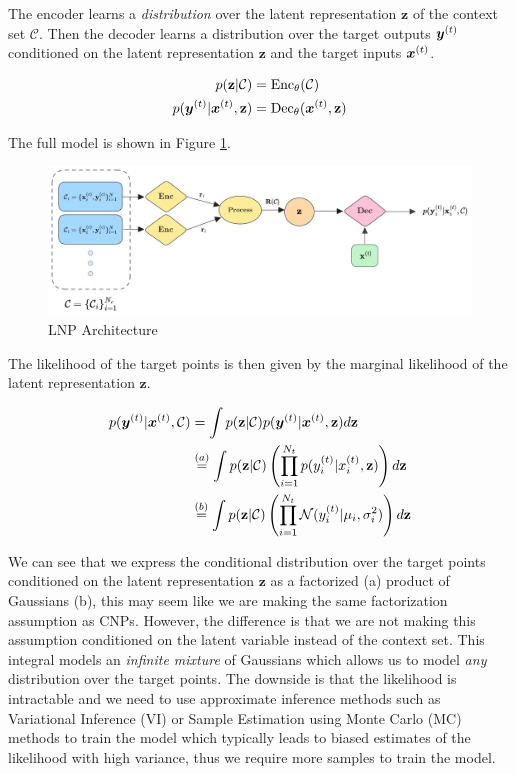 \documentclass[../../main.tex]{subfiles}
\begin{document}
The encoder learns a \emph{distribution} over the latent representation $\mathbf{z}$ of the context set $\mathcal{C}$. Then the decoder learns a distribution over the target outputs $\bm{y}^{(t)}$ conditioned on the latent representation $\mathbf{z}$ and the target inputs $\bm{x}^{(t)}$.

\begin{align*}
    p(\mathbf{z} | \mathcal{C}) &= \text{Enc}_\theta(\mathcal{C})\\ p(\bm{y}^{(t)} | \bm{x}^{(t)}, \mathbf{z}) &= \text{Dec}_\theta(\bm{x}^{(t)}, \mathbf{z})
\end{align*}

The full model is shown in Figure \ref{fig:lnp-architecture}.

\begin{figure}[H]
	\centering
	\includegraphics[height=0.3\textwidth]{./lnp.png}
	\caption{LNP Architecture}
	\label{fig:lnp-architecture}
\end{figure}

The likelihood of the target points is then given by the marginal likelihood of the latent representation $\mathbf{z}$.

\begin{align}
    p(\bm{y}^{(t)} | \bm{x}^{(t)}, \mathcal{C}) &=  \int p(\mathbf{z} | \mathcal{C}) p(\bm{y}^{(t)} | \bm{x}^{(t)}, \mathbf{z})  d\mathbf{z}
    \\ &\stackrel{(a)}{=} \int p(\mathbf{z} | \mathcal{C}) \left(\prod_{i=1}^{N_t} p({y}_i^{(t)} | {x}_i^{(t)}, \mathbf{z})\right)  d\mathbf{z}
    \\ &\stackrel{(b)}{=} \int p(\mathbf{z} | \mathcal{C}) \left(\prod_{i=1}^{N_t} \mathcal{N}({y}_i^{(t)} | \mu_i, \sigma_i^2)\right)  d\mathbf{z}
\end{align}

We can see that we express the conditional distribution over the target points conditioned on the latent representation $\mathbf{z}$ as a factorized (a) product of Gaussians (b), this may seem like we are making the same factorization assumption as CNPs. However, the difference is that we are not making this assumption conditioned on the latent variable instead of the context set. This integral models an \emph{infinite mixture} of Gaussians which allows us to model \emph{any} distribution over the target points.  The downside is that the likelihood is intractable and we need to use approximate inference methods such as Variational Inference (VI) or Sample Estimation using Monte Carlo (MC) methods to train the model which typically leads to biased estimates of the likelihood with high variance, thus we require more samples to train the model.
\end{document}
